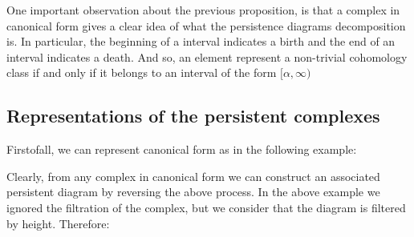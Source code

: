 
One important observation about the previous proposition,
is that a complex in canonical form gives a clear idea of what the persistence 
diagrams decomposition is. In particular, the beginning of a interval
indicates a birth and the end of an interval indicates a death. And
so, an element represent a non-trivial cohomology class if and only if
it belongs to an interval of the form $[\alpha,\infty)$

\subsection{Representations of the persistent complexes}

%


%

%
%




Firstofall, we can represent canonical form as in the following example:



Clearly, from any complex in canonical form we can construct an associated persistent diagram by reversing the above process.
In the above example we ignored the filtration of the complex, but we consider that the diagram is filtered by height.
 Therefore:

